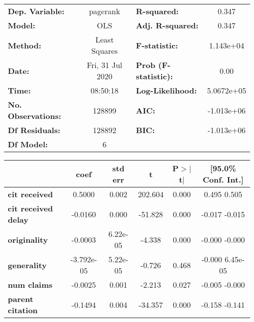 \begin{center}
\begin{tabular}{lclc}
\toprule
\textbf{Dep. Variable:}     &     pagerank     & \textbf{  R-squared:         } &        0.347      \\
\textbf{Model:}             &       OLS        & \textbf{  Adj. R-squared:    } &        0.347      \\
\textbf{Method:}            &  Least Squares   & \textbf{  F-statistic:       } &    1.143e+04      \\
\textbf{Date:}              & Fri, 31 Jul 2020 & \textbf{  Prob (F-statistic):} &        0.00       \\
\textbf{Time:}              &     08:50:18     & \textbf{  Log-Likelihood:    } &    5.0672e+05     \\
\textbf{No. Observations:}  &      128899      & \textbf{  AIC:               } &    -1.013e+06     \\
\textbf{Df Residuals:}      &      128892      & \textbf{  BIC:               } &    -1.013e+06     \\
\textbf{Df Model:}          &           6      & \textbf{                     } &                   \\
\bottomrule
\end{tabular}
\begin{tabular}{lccccc}
                            & \textbf{coef} & \textbf{std err} & \textbf{t} & \textbf{P$>$$|$t$|$} & \textbf{[95.0\% Conf. Int.]}  \\
\midrule
\textbf{cit received}       &       0.5000  &        0.002     &   202.604  &         0.000        &         0.495     0.505       \\
\textbf{cit received delay} &      -0.0160  &        0.000     &   -51.828  &         0.000        &        -0.017    -0.015       \\
\textbf{originality}        &      -0.0003  &     6.22e-05     &    -4.338  &         0.000        &        -0.000    -0.000       \\
\textbf{generality}         &   -3.792e-05  &     5.22e-05     &    -0.726  &         0.468        &        -0.000  6.45e-05       \\
\textbf{num claims}         &      -0.0025  &        0.001     &    -2.213  &         0.027        &        -0.005    -0.000       \\
\textbf{parent citation}    &      -0.1494  &        0.004     &   -34.357  &         0.000        &        -0.158    -0.141       \\

\end{tabular}
\end{center}
